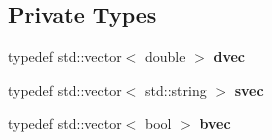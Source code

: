 \subsection*{Private Types}
\begin{DoxyCompactItemize}
\item 
\mbox{\label{classColumn_a7bc6a166ebf694b91384e733b10d3769}} 
typedef std\+::vector$<$ double $>$ {\bfseries dvec}
\item 
\mbox{\label{classColumn_a1d82f6624a714c35b4f258410576293b}} 
typedef std\+::vector$<$ std\+::string $>$ {\bfseries svec}
\item 
\mbox{\label{classColumn_a6e468f6b32e00d0d8cc74011185a6795}} 
typedef std\+::vector$<$ bool $>$ {\bfseries bvec}
\end{DoxyCompactItemize}
